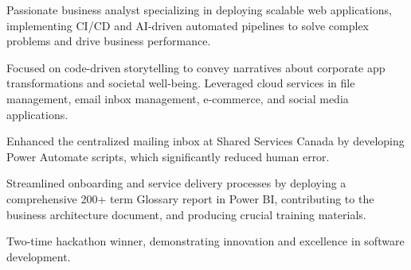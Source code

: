 

\begin{cvparagraph}
\begin{cventries}
{
\begin{cvitems}
    \item {Passionate business analyst specializing in deploying scalable web applications, implementing CI/CD and AI-driven automated pipelines to solve complex problems and drive business performance.}
    \item {Focused on code-driven storytelling to convey narratives about corporate app transformations and societal well-being. Leveraged cloud services in file management, email inbox management, e-commerce, and social media applications.}
    \item {Enhanced the centralized mailing inbox at Shared Services Canada by developing Power Automate scripts, which significantly reduced human error.}
    \item {Streamlined onboarding and service delivery processes by deploying a comprehensive 200+ term Glossary report in Power BI, contributing to the business architecture document, and producing crucial training materials.}
    \item {Two-time hackathon winner, demonstrating innovation and excellence in software development.}
  \end{cvitems}
}
\end{cventries}
\end{cvparagraph}
